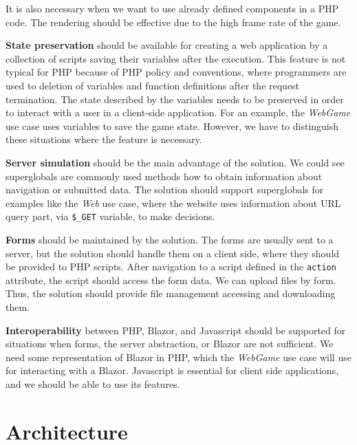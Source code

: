 It is also necessary when we want to use already defined components in a PHP code.
The rendering should be effective due to the high frame rate of the game.
\par
\textbf{State preservation} should be available for creating a web application by a collection of scripts saving their variables after the execution.
This feature is not typical for PHP because of PHP policy and conventions, where programmers are used to deletion of variables and function definitions after the request termination.
The state described by the variables needs to be preserved in order to interact with a user in a client-side application. 
For an example, the \textit{WebGame} use case uses variables to save the game state. 
However, we have to distinguish these situations where the feature is necessary.
\par
\textbf{Server simulation} should be the main advantage of the solution.
We could see superglobals are commonly used methods how to obtain information about navigation or submitted data.
The solution should support superglobals for examples like the \textit{Web} use case, where the website uses information about URL query part, via \texttt{\$\_GET} variable, to make decisions.
\par
\textbf{Forms} should be maintained by the solution. 
The forms are usually sent to a server, but the solution should handle them on a client side, where they should be provided to PHP scripts.
After navigation to a script defined in the \texttt{action} attribute, the script should access the form data.
We can upload files by form.
Thus, the solution should provide file management accessing and downloading them.
\par
\textbf{Interoperability} between PHP, Blazor, and Javascript should be supported for situations when forms, the server abstraction, or Blazor are not sufficient.
We need some representation of Blazor in PHP, which the \textit{WebGame} use case will use for interacting with a Blazor.
Javascript is essential for client side applications, and we should be able to use its features.

\section{Architecture}

